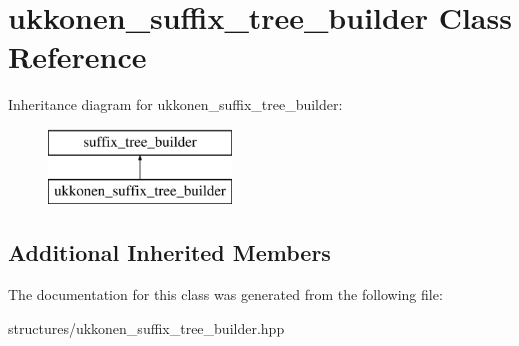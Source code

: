 \hypertarget{classukkonen__suffix__tree__builder}{\section{ukkonen\+\_\+suffix\+\_\+tree\+\_\+builder Class Reference}
\label{classukkonen__suffix__tree__builder}
}
Inheritance diagram for ukkonen\+\_\+suffix\+\_\+tree\+\_\+builder\+:\begin{figure}[H]
\begin{center}
\leavevmode
\includegraphics[height=2.000000cm]{classukkonen__suffix__tree__builder}
\end{center}
\end{figure}
\subsection*{Additional Inherited Members}


The documentation for this class was generated from the following file\+:\begin{DoxyCompactItemize}
\item 
structures/ukkonen\+\_\+suffix\+\_\+tree\+\_\+builder.\+hpp\end{DoxyCompactItemize}
